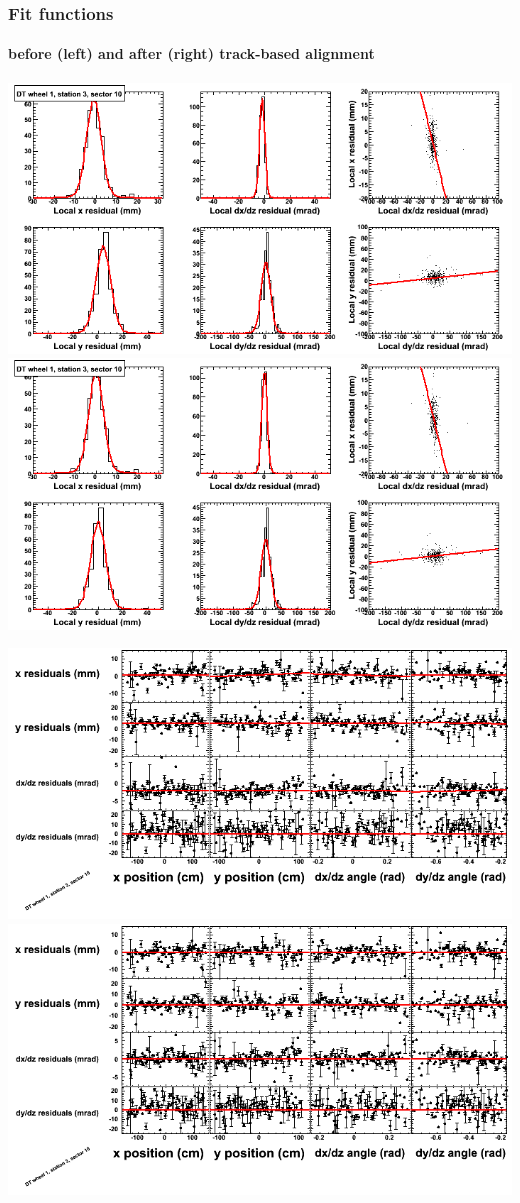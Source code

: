 \documentclass[compress]{beamer}
\begin{document}
\begin{frame}
\frametitle{Fit functions}
\framesubtitle{before (left) and after (right) track-based alignment}
\includegraphics[width=0.5\linewidth]{fitfunctions_re01/MBwhDst3sec10_bellcurves.png} \includegraphics[width=0.5\linewidth]{fitfunctions_re05/MBwhDst3sec10_bellcurves.png}

\includegraphics[width=0.5\linewidth]{fitfunctions_re01/MBwhDst3sec10_polynomials.png} \includegraphics[width=0.5\linewidth]{fitfunctions_re05/MBwhDst3sec10_polynomials.png}
\end{frame}
\end{document}
